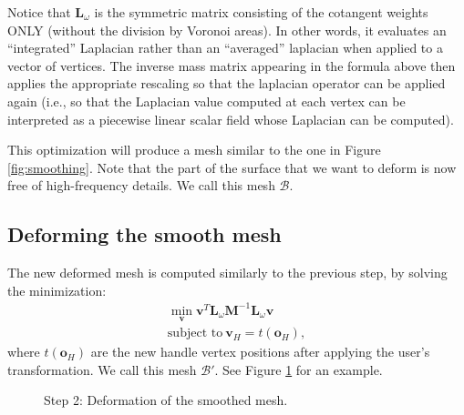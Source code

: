 \documentclass[11pt]{amsart}
\begin{document}
Notice that $\textbf{L}_\omega$ is the symmetric matrix
consisting of the cotangent weights ONLY (without the division by Voronoi
areas). In other words, it evaluates an ``integrated'' Laplacian rather than an
``averaged'' laplacian when applied to a vector of vertices. The inverse mass
matrix appearing in the formula above then applies the appropriate rescaling
so that the laplacian operator can be applied again (i.e., so that the
Laplacian value computed at each vertex can be interpreted as a piecewise
linear scalar field whose Laplacian can be computed).

%
This optimization will produce a mesh similar to the one in Figure \ref{fig:smoothing}. Note that the part of the surface that we want to deform is now free of high-frequency details.
%
We call this mesh $\mathcal{B}$.

\subsection{Deforming the smooth mesh}
The new deformed mesh is computed similarly to the previous step, by solving the minimization:
\begin{eqnarray*} \min_\textbf{v} \textbf{v}^T \textbf{L}_\omega \textbf{M}^{-1} \textbf{L}_\omega \textbf{v} \\
 \mbox{subject to}
 \ \textbf{v}_H = t(\textbf{o}_H),
\end{eqnarray*}
where $t(\textbf{o}_H)$ are the new handle vertex positions after applying the user's transformation.
We call this mesh $\mathcal{B}'$. See Figure \ref{fig:deform} for an example.

\begin{figure}
   \centering
\hspace{0.9cm}
   \caption{Step 2: Deformation of the smoothed mesh.}
   \label{fig:deform}
\end{figure}
\end{document}
